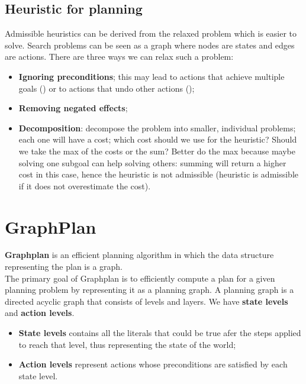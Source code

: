\documentclass{article}
\begin{document}
\subsection{Heuristic for planning}

Admissible heuristics can be derived from the relaxed problem which is easier to solve. Search problems can be seen as a graph where nodes are states and edges are actions. There are three ways we can relax such a problem:

\begin{itemize}
    \item \textbf{Ignoring preconditions}; this may lead to actions that achieve multiple goals (\faThumbsOUp) or to actions that undo other actions (\faThumbsODown);
    \item \textbf{Removing negated effects}; 
    \item \textbf{Decomposition}: decompose the problem into smaller, individual problems; each one will have a cost; which cost should we use for the heuristic? Should we take the max of the costs or the sum? Better do the max because maybe solving one subgoal can help solving others: summing will return a higher cost in this case, hence the heuristic is not admissible (heuristic is admissible if it does not overestimate the cost).
\end{itemize}

\newpage

\section{GraphPlan}

\textbf{Graphplan} is an efficient planning algorithm in which the data structure representing the plan is a graph. \\ 

The primary goal of Graphplan is to efficiently compute a plan for a given planning problem by representing it as a planning graph. A planning graph is a directed acyclic graph that consists of levels and layers. We have \textbf{state levels} and \textbf{action levels}. 

\begin{itemize}
    \item \textbf{State levels} contains all the literals that could be true afer the steps applied to reach that level, thus representing the state of the world;
    \item \textbf{Action levels} represent actions whose preconditions are satisfied by each state level.
\end{itemize}
\end{document}
